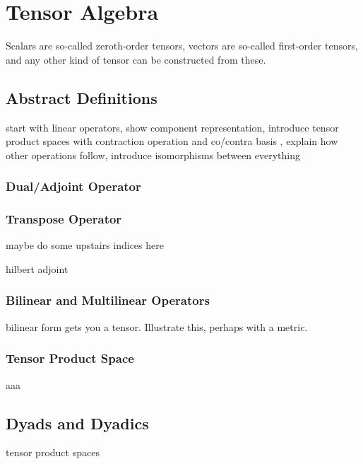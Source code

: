 \chapter{Tensor Algebra}
\label{chapter:Tensor-Algebra2}


Scalars are so-called zeroth-order tensors, vectors are so-called first-order tensors, and any other kind of tensor can be constructed from these.

\section{Abstract Definitions}

start with linear operators, show component representation, introduce tensor product spaces with contraction operation and co/contra basis  , explain how other operations follow, introduce isomorphisms between everything



\subsection{Dual/Adjoint Operator}

\subsection{Transpose Operator}

maybe do some upstairs indices here

hilbert adjoint

\subsection{Bilinear and Multilinear Operators}

bilinear form gets you a tensor. Illustrate this, perhaps with a metric.

\subsection{Tensor Product Space}

aaa

\section{Dyads and Dyadics}

tensor product spaces

